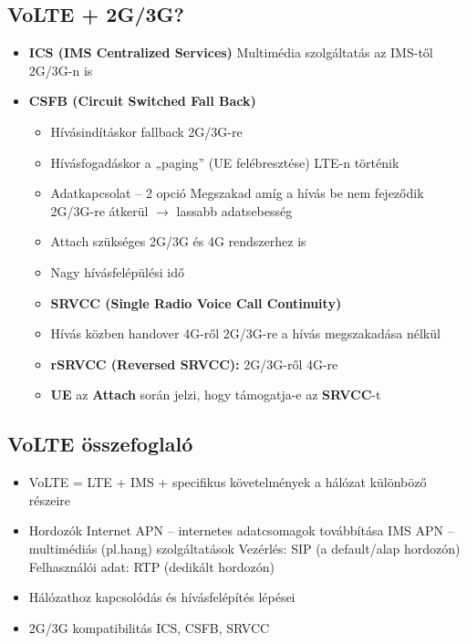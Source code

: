 \documentclass[10pt,a4paper]{article}
\begin{document}
\subsection{VoLTE + 2G/3G?}
\begin{itemize}
	\item \textbf{ICS (IMS Centralized Services)}
		\subitem Multimédia szolgáltatás az IMS-től 2G/3G-n is
\item \textbf{CSFB (Circuit Switched Fall Back)}
\begin{itemize}
	\item Hívásindításkor fallback 2G/3G-re
\item Hívásfogadáskor a „paging” (UE felébresztése) LTE-n történik
\item Adatkapcsolat – 2 opció
\subitem  Megszakad amíg a hívás be nem fejeződik
\subitem  2G/3G-re átkerül $\rightarrow$ lassabb adatsebesség
\item Attach szükséges 2G/3G és 4G rendszerhez is
\item Nagy hívásfelépülési idő
\end{itemize}
\begin{itemize}
\item\textbf{ SRVCC (Single Radio Voice Call Continuity)}
\item Hívás közben handover 4G-ről 2G/3G-re a hívás
megszakadása nélkül
\item \textbf{rSRVCC (Reversed SRVCC):} 2G/3G-ről 4G-re
\item \textbf{UE} az \textbf{Attach} során jelzi, hogy támogatja-e az \textbf{SRVCC}-t
\end{itemize}
\end{itemize}
\subsection{VoLTE összefoglaló}
\begin{itemize}
	\item VoLTE = LTE + IMS + specifikus
	követelmények a hálózat különböző részeire
	\item  Hordozók
	 \subitem Internet APN – internetes adatcsomagok továbbítása
	 \subitem IMS APN – multimédiás (pl.hang) szolgáltatások
	\subsubitem  Vezérlés: SIP (a default/alap hordozón)
	\subsubitem Felhasználói adat: RTP (dedikált hordozón)
	\item  Hálózathoz kapcsolódás és hívásfelépítés
	lépései
	\item  2G/3G kompatibilitás
	 ICS, CSFB, SRVCC
\end{itemize}
\end{document}
